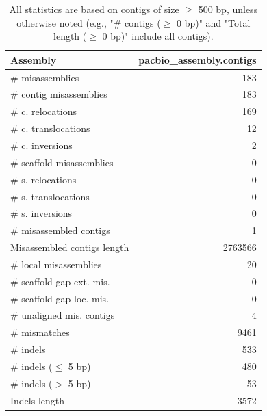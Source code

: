 \documentclass[12pt,a4paper]{article}
\begin{document}
\begin{table}[ht]
\begin{center}
\caption{All statistics are based on contigs of size $\geq$ 500 bp, unless otherwise noted (e.g., "\# contigs ($\geq$ 0 bp)" and "Total length ($\geq$ 0 bp)" include all contigs).}
\begin{tabular}{|l*{1}{|r}|}
\hline
Assembly & pacbio\_assembly.contigs \\ \hline
\# misassemblies & 183 \\ \hline
\hspace{2mm}\# contig misassemblies & 183 \\ \hline
\hspace{5mm}\# c. relocations & 169 \\ \hline
\hspace{5mm}\# c. translocations & 12 \\ \hline
\hspace{5mm}\# c. inversions & 2 \\ \hline
\hspace{2mm}\# scaffold misassemblies & 0 \\ \hline
\hspace{5mm}\# s. relocations & 0 \\ \hline
\hspace{5mm}\# s. translocations & 0 \\ \hline
\hspace{5mm}\# s. inversions & 0 \\ \hline
\# misassembled contigs & 1 \\ \hline
Misassembled contigs length & 2763566 \\ \hline
\# local misassemblies & 20 \\ \hline
\# scaffold gap ext. mis. & 0 \\ \hline
\# scaffold gap loc. mis. & 0 \\ \hline
\# unaligned mis. contigs & 4 \\ \hline
\# mismatches & 9461 \\ \hline
\# indels & 533 \\ \hline
\hspace{5mm}\# indels ($\leq$ 5 bp) & 480 \\ \hline
\hspace{5mm}\# indels ($>$ 5 bp) & 53 \\ \hline
Indels length & 3572 \\ \hline
\end{tabular}
\end{center}
\end{table}
\end{document}
